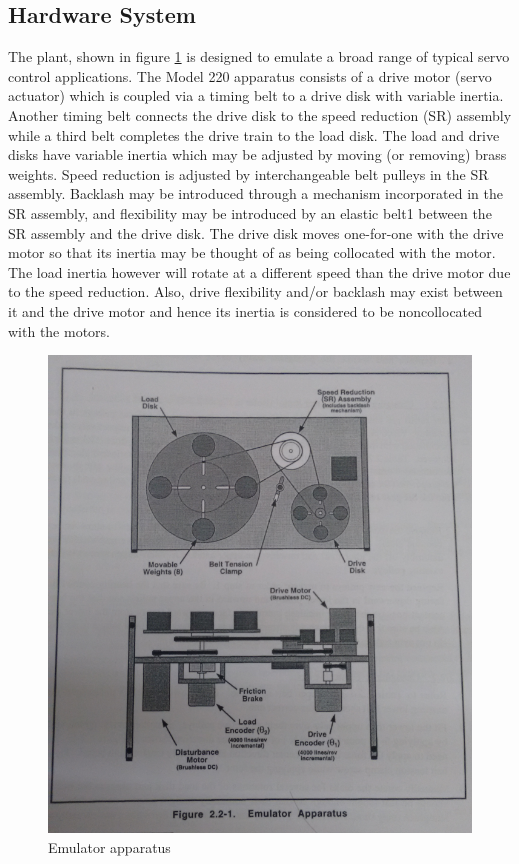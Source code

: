 \documentclass[11pt, a4paper]{article}
\begin{document}
\subsection{Hardware System}
The plant, shown in figure \ref{Fig5} is designed to emulate a broad range of typical servo control applications. The Model 220 apparatus consists of a drive motor (servo actuator) which is coupled via a timing belt to a drive disk with variable inertia. Another timing belt connects the drive disk to the speed reduction (SR) assembly while a third belt completes the drive train to the load disk. The load and drive disks have variable inertia which may be adjusted by moving (or removing) brass weights. Speed reduction is adjusted by interchangeable belt pulleys in the SR assembly. Backlash may be introduced through a mechanism incorporated in the SR assembly, and flexibility may be introduced by an elastic belt1 between the SR assembly and the drive disk. The drive disk moves one-for-one with the drive motor so that its inertia may be thought of as being collocated with the motor. The load inertia however will rotate at a different speed than the drive motor due to the speed reduction. Also, drive flexibility and/or backlash may exist between it and the drive motor and hence its inertia is considered to be noncollocated with the motors.
\begin{figure}[H]
\centering
\includegraphics[width = \textwidth]{hw_setup.png}
\caption{Emulator apparatus}
\label{Fig5}
\end{figure}
\end{document}

